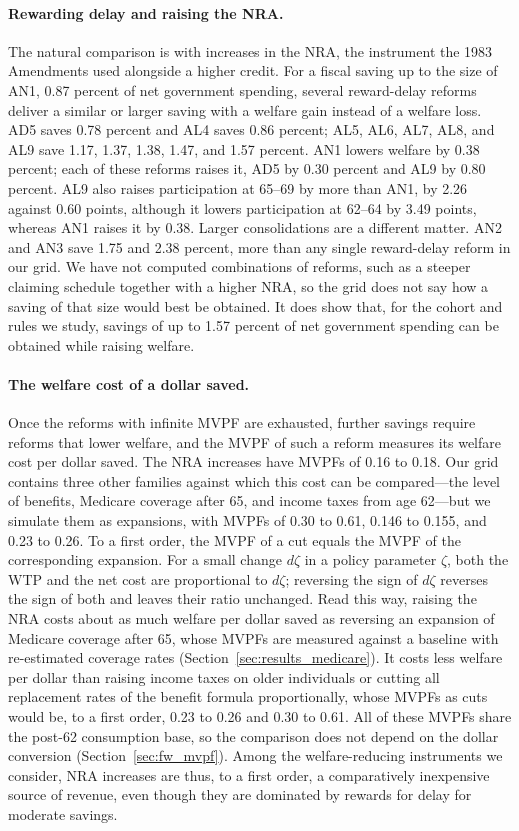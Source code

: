 \paragraph{Rewarding delay and raising the NRA.} The natural comparison is with increases in the NRA, the instrument the 1983 Amendments used alongside a higher credit. For a fiscal saving up to the size of AN1, 0.87 percent of net government spending, several reward-delay reforms deliver a similar or larger saving with a welfare gain instead of a welfare loss. AD5 saves 0.78 percent and AL4 saves 0.86 percent; AL5, AL6, AL7, AL8, and AL9 save 1.17, 1.37, 1.38, 1.47, and 1.57 percent. AN1 lowers welfare by 0.38 percent; each of these reforms raises it, AD5 by 0.30 percent and AL9 by 0.80 percent. AL9 also raises participation at 65--69 by more than AN1, by 2.26 against 0.60 points, although it lowers participation at 62--64 by 3.49 points, whereas AN1 raises it by 0.38. Larger consolidations are a different matter. AN2 and AN3 save 1.75 and 2.38 percent, more than any single reward-delay reform in our grid. We have not computed combinations of reforms, such as a steeper claiming schedule together with a higher NRA, so the grid does not say how a saving of that size would best be obtained. It does show that, for the cohort and rules we study, savings of up to 1.57 percent of net government spending can be obtained while raising welfare.

\paragraph{The welfare cost of a dollar saved.} Once the reforms with infinite MVPF are exhausted, further savings require reforms that lower welfare, and the MVPF of such a reform measures its welfare cost per dollar saved. The NRA increases have MVPFs of 0.16 to 0.18. Our grid contains three other families against which this cost can be compared---the level of benefits, Medicare coverage after 65, and income taxes from age 62---but we simulate them as expansions, with MVPFs of 0.30 to 0.61, 0.146 to 0.155, and 0.23 to 0.26. To a first order, the MVPF of a cut equals the MVPF of the corresponding expansion. For a small change $d\zeta$ in a policy parameter $\zeta$, both the WTP and the net cost are proportional to $d\zeta$; reversing the sign of $d\zeta$ reverses the sign of both and leaves their ratio unchanged. Read this way, raising the NRA costs about as much welfare per dollar saved as reversing an expansion of Medicare coverage after 65, whose MVPFs are measured against a baseline with re-estimated coverage rates (Section~\ref{sec:results_medicare}). It costs less welfare per dollar than raising income taxes on older individuals or cutting all replacement rates of the benefit formula proportionally, whose MVPFs as cuts would be, to a first order, 0.23 to 0.26 and 0.30 to 0.61. All of these MVPFs share the post-62 consumption base, so the comparison does not depend on the dollar conversion (Section~\ref{sec:fw_mvpf}). Among the welfare-reducing instruments we consider, NRA increases are thus, to a first order, a comparatively inexpensive source of revenue, even though they are dominated by rewards for delay for moderate savings.


